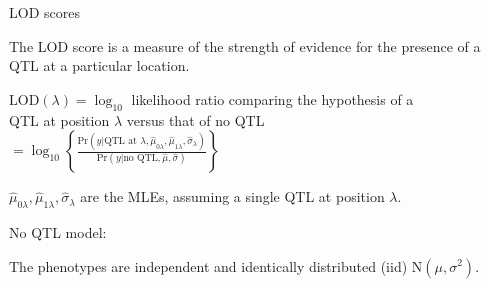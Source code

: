 \documentclass[aspectratio=169,12pt,t]{beamer}
\begin{document}
\begin{frame}[c]{LOD scores}

 The LOD score is a measure of the {\hilit strength of
evidence} for the presence of a QTL at a particular
location.

\bbi
\itemsep18pt

\item[] $\text{LOD}(\lambda) = \log_{10}$ likelihood ratio comparing the hypothesis of a \\

\hspace{25mm} QTL at position $\lambda$ versus that of no QTL \\[8pt]

\hspace{14mm} $= \log_{10} \left\{ \frac{\text{Pr}(y | \text{QTL at $\lambda$}, \hat{\mu}_{0\lambda},
\hat{\mu}_{1\lambda}, \hat{\sigma}_\lambda)}{\text{Pr}(y | \text{no QTL}, \hat{\mu},
\hat{\sigma})} \right\}$

 \item[] $\hat{\mu}_{0\lambda}, \hat{\mu}_{1\lambda}, \hat{\sigma}_\lambda$ are the MLEs,
assuming a single QTL at position $\lambda$.


 \item[] {\hilit No QTL model:}

\bi
  \item[] {\color{foreground} The phenotypes are independent and identically
distributed (iid) $\text{N}(\mu, \sigma^2)$}.
\ei

\ei



\end{frame}
\end{document}
